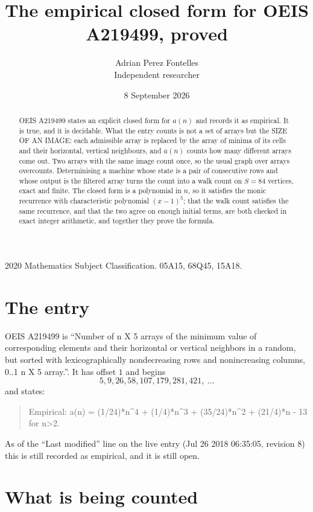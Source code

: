 \documentclass[11pt,a4paper]{article}
\title{The empirical closed form for OEIS A219499, proved}
\author{Adrian Perez Fontelles\\ \small Independent researcher}
\date{8 September 2026}
\theoremstyle{plain}
\theoremstyle{definition}
\begin{document}
\maketitle

\begin{abstract}
OEIS A219499 states an explicit closed form for $a(n)$ and records it as empirical. It is true, and
it is decidable. What the entry counts is not a set of arrays but the SIZE OF AN IMAGE: each
admissible array is replaced by the array of minima of its cells and their horizontal, vertical neighbours,
and $a(n)$ counts how many different arrays come out. Two arrays with the same image count
once, so the usual graph over arrays overcounts. Determinising a machine whose state is a pair
of consecutive rows and whose output is the filtered array turns the count into a walk count on
$S=84$ vertices, exact and finite. The closed form is a polynomial in $n$, so it satisfies the
monic recurrence with characteristic polynomial $(x-1)^{5}$; that the walk count
satisfies the same recurrence, and that the two agree on enough initial terms, are both checked
in exact integer arithmetic, and together they prove the formula.
\end{abstract}

\noindent\small 2020 Mathematics Subject Classification. 05A15, 68Q45, 15A18.\normalsize

\section{The entry}

OEIS A219499 is ``Number of n X 5 arrays of the minimum value of corresponding elements and their horizontal or vertical neighbors in a random, but sorted with lexicographically nondecreasing rows and nonincreasing columns, 0..1 n X 5 array.''. It has offset $1$ and begins
\[
5, 9, 26, 58, 107, 179, 281, 421,\ \dots
\]
and states:
\begin{quote}
Empirical: a(n) = (1/24)*n\^{}4 + (1/4)*n\^{}3 + (35/24)*n\^{}2 + (21/4)*n - 13 for n>2.
\end{quote}
As of the ``Last modified'' line on the live entry (Jul 26 2018 06:35:05, revision 8)
this is still recorded as empirical, and it is still open.

\section{What is being counted}
\end{document}
